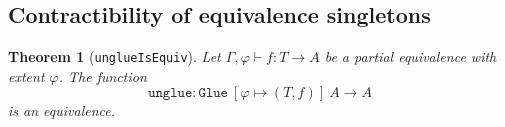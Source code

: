 \documentclass[12pt,a4paper,twoside,xetex]{book} %
\newtheorem{theorem}{Theorem}[section]
\newcommand{\op}[1]{\mathtt{#1}}
\newcommand{\type}{\mathcal{U}}
\begin{document}
% 
% 
% 
% 
% 

\subsection{Contractibility of equivalence singletons}

\begin{theorem}[\texttt{unglueIsEquiv}]
Let $\Gamma, \varphi \vdash f : T \rightarrow A$ be a partial equivalence with 
extent $\varphi$. The function $$ \op{unglue} : \op{Glue} \ \left[\varphi 
\mapsto (T,f) \right] \ A \rightarrow A$$ is an equivalence. 
\end{theorem}
\end{document}
